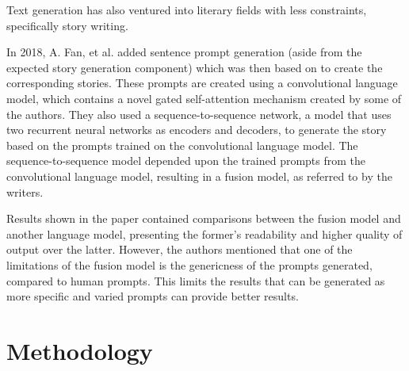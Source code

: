 \documentclass[journal]{./IEEE/IEEEtran}
\begin{document}

Text generation has also ventured into literary fields with less constraints, specifically story writing.

In 2018, A. Fan, et al. added sentence prompt generation (aside from the expected story generation component) which was then based on to create the corresponding stories. \cite{FLD2018} These prompts are created using a convolutional language model, which contains a novel gated self-attention mechanism created by some of the authors. \cite{DFAG2016}
They also used a sequence-to-sequence network, a model that uses two recurrent neural networks as encoders and decoders, to generate the story based on the prompts trained on the convolutional language model. The sequence-to-sequence model depended upon the trained prompts from the convolutional language model, resulting in a fusion model, as referred to by the writers.

Results shown in the paper contained comparisons between the fusion model and another language model,  presenting the former's readability and higher quality of output over the latter. However, the authors mentioned that one of the limitations of the fusion model is the genericness of the prompts generated, compared to human prompts. This limits the results that can be generated as more specific and varied prompts can provide better results.


\section {Methodology}


\end{document}
